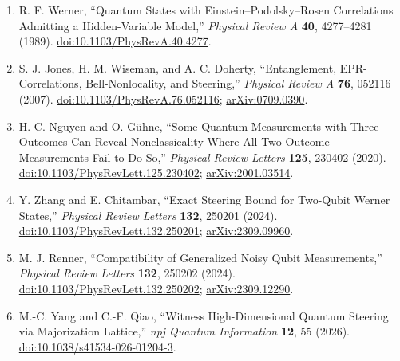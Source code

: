 \begin{enumerate}[label={},leftmargin=4.8em,labelsep=0.5em]
  \footnotesize
  \item[\textup{[Wer89]}]\label{ref:p33-werner}
  R. F. Werner, ``Quantum States with Einstein--Podolsky--Rosen Correlations
  Admitting a Hidden-Variable Model,'' \emph{Physical Review A} \textbf{40},
  4277--4281 (1989).
  \href{https://doi.org/10.1103/PhysRevA.40.4277}{doi:10.1103/PhysRevA.40.4277}.

  \item[\textup{[JWD07]}]\label{ref:p33-jones}
  S. J. Jones, H. M. Wiseman, and A. C. Doherty, ``Entanglement,
  EPR-Correlations, Bell-Nonlocality, and Steering,'' \emph{Physical Review A}
  \textbf{76}, 052116 (2007).
  \href{https://doi.org/10.1103/PhysRevA.76.052116}{doi:10.1103/PhysRevA.76.052116};
  \href{https://arxiv.org/abs/0709.0390}{arXiv:0709.0390}.

  \item[\textup{[NG20]}]\label{ref:p33-nguyen}
  H. C. Nguyen and O. G\"uhne, ``Some Quantum Measurements with Three
  Outcomes Can Reveal Nonclassicality Where All Two-Outcome Measurements Fail
  to Do So,'' \emph{Physical Review Letters} \textbf{125}, 230402 (2020).
  \href{https://doi.org/10.1103/PhysRevLett.125.230402}{doi:10.1103/PhysRevLett.125.230402};
  \href{https://arxiv.org/abs/2001.03514}{arXiv:2001.03514}.

  \item[\textup{[ZC24]}]\label{ref:p33-zhang}
  Y. Zhang and E. Chitambar, ``Exact Steering Bound for Two-Qubit Werner
  States,'' \emph{Physical Review Letters} \textbf{132}, 250201 (2024).
  \href{https://doi.org/10.1103/PhysRevLett.132.250201}{doi:10.1103/PhysRevLett.132.250201};
  \href{https://arxiv.org/abs/2309.09960}{arXiv:2309.09960}.

  \item[\textup{[Ren24]}]\label{ref:p33-renner}
  M. J. Renner, ``Compatibility of Generalized Noisy Qubit Measurements,''
  \emph{Physical Review Letters} \textbf{132}, 250202 (2024).
  \href{https://doi.org/10.1103/PhysRevLett.132.250202}{doi:10.1103/PhysRevLett.132.250202};
  \href{https://arxiv.org/abs/2309.12290}{arXiv:2309.12290}.

  \item[\textup{[YQ26]}]\label{ref:p33-yang}
  M.-C. Yang and C.-F. Qiao, ``Witness High-Dimensional Quantum Steering via
  Majorization Lattice,'' \emph{npj Quantum Information} \textbf{12}, 55
  (2026). \href{https://doi.org/10.1038/s41534-026-01204-3}{doi:10.1038/s41534-026-01204-3}.
\end{enumerate}

